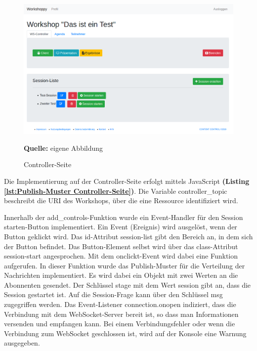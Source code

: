 \begin{figure}[H]
  \begin{center}
    \includegraphics[scale=0.3]{img/controller-seite_real}
	\caption{Controller-Seite} 
	\footnotesize\sffamily\textbf{Quelle:} eigene Abbildung
	\label{fig:controller-Seite final}
  \end{center}   
\end{figure}

Die Implementierung auf der Controller-Seite erfolgt mittels JavaScript \textbf{(Listing \ref{lst:Publish-Muster Controller-Seite})}. Die Variable \glqq controller\_topic\grqq{} beschreibt die URI des Workshops, über die eine Ressource identifiziert wird.\bigskip 

Innerhalb der \glqq add\_controls\grqq{}-Funktion wurde ein Event-Handler für den \glqq Session starten\grqq{}-Button implementiert. Ein Event (Ereignis) wird ausgelöst, wenn der Button geklickt wird. Das id-Attribut \glqq session-list\grqq{} gibt den Bereich an, in dem sich der Button befindet. Das Button-Element selbst wird über das class-Attribut \glqq session-start\grqq{} angesprochen. Mit dem onclickt-Event wird dabei eine Funktion aufgerufen. In dieser Funktion wurde das Publish-Muster für die Verteilung der Nachrichten implementiert. Es wird dabei ein Objekt mit zwei Werten an die Abonnenten gesendet. Der Schlüssel \glqq stage\grqq{} mit dem Wert \glqq session\grqq{} gibt an, dass die Session gestartet ist. Auf die Session-Frage kann über den Schlüssel \glqq msg\grqq{} zugegriffen werden. Das Event-Listener \glqq connection.onopen\grqq{} indiziert, dass die Verbindung mit dem WebSocket-Server bereit ist, so dass man Informationen versenden und empfangen kann. Bei einem Verbindungsfehler oder wenn die Verbindung zum WebSocket geschlossen ist, wird auf der Konsole eine Warnung ausgegeben.


